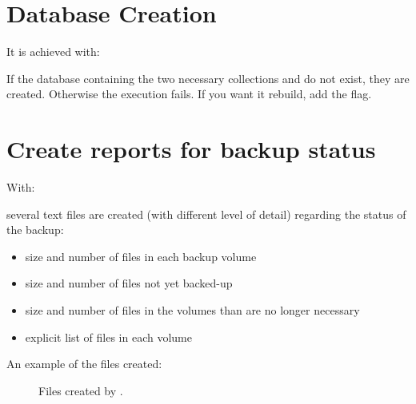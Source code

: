 \documentclass[letterpaper,10pt,english]{sphinxmanual}
\begin{document}
\section{Database Creation}
\label{\detokenize{index:database-creation}}
It is achieved with:

\begin{sphinxVerbatim}[commandchars=\\\{\}]
  
\end{sphinxVerbatim}

If the database containing the two necessary collections  and  do not exist, they are created.
Otherwise the execution fails. If you want it rebuild, add the  flag.


\section{Create reports for backup status}
\label{\detokenize{index:create-reports-for-backup-status}}
With:

\begin{sphinxVerbatim}[commandchars=\\\{\}]
  
\end{sphinxVerbatim}

several text files are created (with different level of detail) regarding the status of the backup:
\begin{itemize}
\item {} 
size and number of files in each backup volume

\item {} 
size and number of files not yet backed-up

\item {} 
size and number of files in the volumes than are no longer necessary

\item {} 
explicit list of files in each volume

\end{itemize}

An example of the files created:
\begin{figure}[htbp]
\centering
\capstart

\noindent{}
\caption{Files created by .}\label{\detokenize{index:id9}}\end{figure}
\end{document}
